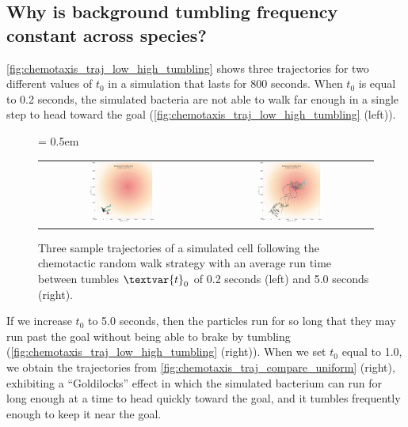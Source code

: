 \FloatBarrier
{}
\subsection{Why is background tumbling frequency constant across species?}

\autoref{fig:chemotaxis_traj_low_high_tumbling} shows three trajectories for two different values of $t_0$ in a simulation that lasts for 800 seconds. When $t_0$ is equal to 0.2 seconds, the simulated bacteria are not able to walk far enough in a single step to head toward the goal (\autoref{fig:chemotaxis_traj_low_high_tumbling} (left)).\\

\begin{figure}[h]
\centering
\mySfFamily
\tabcolsep = 0.5em
\begin{tabular}{c c}
\includegraphics[width = 0.4\textwidth]{../images_CMYK/chemotaxis_traj_0.2_uniform} & \includegraphics[width = 0.4\textwidth]{../images_CMYK/chemotaxis_traj_5.0_uniform}
\end{tabular}
\caption{Three sample trajectories of a simulated cell following the chemotactic random walk strategy with an average run time between tumbles $\textvar{t}_\text{0}$ of 0.2 seconds (left) and 5.0 seconds (right).}
\label{fig:chemotaxis_traj_low_high_tumbling}
\end{figure}

 If we increase $t_0$ to 5.0 seconds, then the particles run for so long that they may run past the goal without being able to brake by tumbling (\autoref{fig:chemotaxis_traj_low_high_tumbling} (right)). When we set $t_0$ equal to 1.0, we obtain the trajectories from \autoref{fig:chemotaxis_traj_compare_uniform} (right), exhibiting a ``Goldilocks'' effect in which the simulated bacterium can run for long enough at a time to head quickly toward the goal, and it tumbles frequently enough to keep it near the goal.

